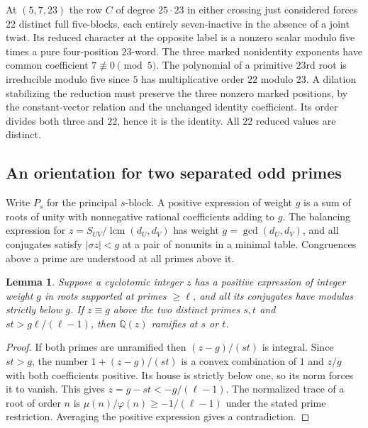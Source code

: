 \documentclass[11pt,a4paper]{article}
\numberwithin{equation}{section}
\newtheorem{lemma}[theorem]{Lemma}
\theoremstyle{remark}
\newcommand{\QQ}{\mathbb Q}
\begin{document}
At $(5,7,23)$ the row
$C$ of degree $25\cdot23$ in either crossing just considered
forces $22$ distinct full five-blocks, each entirely
seven-inactive in the absence of a joint twist. Its reduced
character at the opposite label is a nonzero scalar modulo five
times a pure four-position $23$-word. The three marked nonidentity
exponents have common coefficient $7\not\equiv0\pmod5$. The
polynomial of a primitive $23$rd root is irreducible modulo five
since $5$ has multiplicative order $22$ modulo $23$. A dilation
stabilizing the reduction must preserve the three nonzero marked
positions, by the constant-vector relation and the unchanged
identity coefficient. Its order divides both three and $22$, hence
it is the identity. All $22$ reduced values are distinct.

\subsection{An orientation for two separated odd primes}\label{found:D:6}
\label{found:D:key:sec:odd-orientation}
Write $P_s$ for the principal $s$-block. A positive expression of weight $g$ is a sum of roots of unity with nonnegative rational coefficients adding to $g$. The balancing expression for $z=S_{UV}/\operatorname{lcm}(d_U,d_V)$ has weight $g=\gcd(d_U,d_V)$, and all conjugates satisfy $|\sigma z|<g$ at a pair of nonunits in a minimal table. Congruences above a prime are understood at all primes above it.

\begin{lemma}\label{found:D:6.1}\label{found:D:key:lem:positive-double-residue}
Suppose a cyclotomic integer $z$ has a positive expression of integer weight $g$ in roots supported at primes $\ge\ell$, and all its conjugates have modulus strictly below $g$. If $z\equiv g$ above the two distinct primes $s,t$ and $st>g\ell/(\ell-1)$, then $\QQ(z)$ ramifies at $s$ or $t$.
\end{lemma}
\begin{proof}
If both primes are unramified then $(z-g)/(st)$ is integral. Since $st>g$, the number $1+(z-g)/(st)$ is a convex combination of $1$ and $z/g$ with both coefficients positive. Its house is strictly below one, so its norm forces it to vanish. This gives $z=g-st<-g/(\ell-1)$. The normalized trace of a root of order $n$ is $\mu(n)/\varphi(n)\ge-1/(\ell-1)$ under the stated prime restriction. Averaging the positive expression gives a contradiction.
\end{proof}
\end{document}
